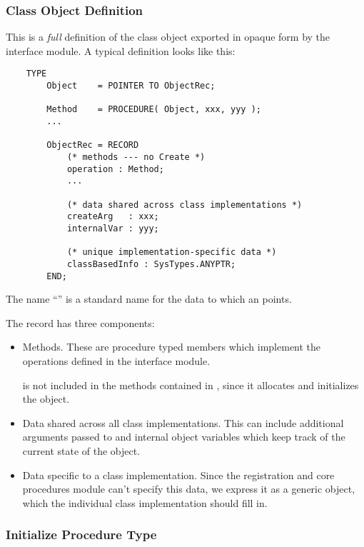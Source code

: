 \subsubsection{Class Object Definition}

This is a {\em full\/} definition of the class object exported in opaque form
by the interface module.  A typical definition looks like this:

\begin{verbatim}
    TYPE
        Object    = POINTER TO ObjectRec;

        Method    = PROCEDURE( Object, xxx, yyy );
        ...

        ObjectRec = RECORD
            (* methods --- no Create *)
            operation : Method;
            ...

            (* data shared across class implementations *)
            createArg   : xxx;
            internalVar : yyy;

            (* unique implementation-specific data *)
            classBasedInfo : SysTypes.ANYPTR;
        END;
\end{verbatim}

The name ``'' is a standard name for the data to which an
 points.

The  record has three components: 
\begin{itemize}
\item
 Methods.  These are procedure typed members which implement the operations
 defined in the interface module.

  is not included in the methods contained in ,
 since it allocates and initializes the object.
\item
 Data shared across all class implementations.  This can include additional
 arguments passed to  and internal object variables which keep
 track of the current state of the object.

\item
 Data specific to a class implementation.  Since the registration and core
 procedures module can't specify this data, we express it as a generic
 object, which the individual class implementation should fill in.
\end{itemize}

\subsubsection{Initialize Procedure Type}

